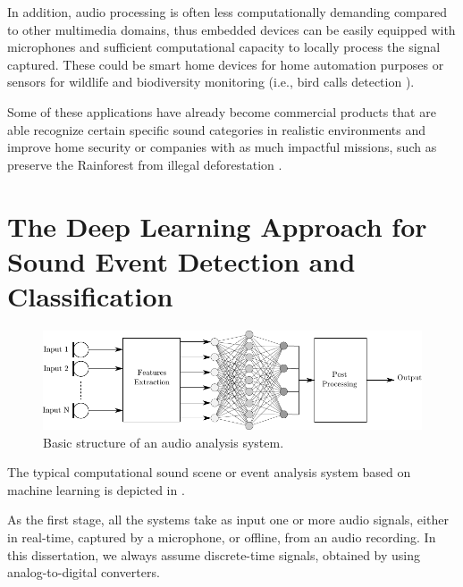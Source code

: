 In addition, audio processing is often less computationally demanding compared to other multimedia domains, thus embedded devices can be easily equipped with microphones and sufficient computational capacity to locally process the signal captured. These could be smart home devices for home automation purposes or sensors for wildlife and biodiversity monitoring (i.e., bird calls detection \cite{grill2017two}). 


Some of these applications have already become commercial products that are able recognize certain specific sound categories in realistic environments and improve home security \cite{audioanalytic}  or companies with as much impactful missions, such as preserve the Rainforest from illegal deforestation \cite{rainforest}.

\section[The Deep Learning Approach]{The Deep Learning Approach for Sound Event Detection and Classification}

\begin{figure}[h]
	\centering
	\includegraphics[width=\linewidth]{img/flowchart_1.pdf}
	\caption[Basic structure]{Basic structure of an audio analysis system.}
	\label{fig:base-system}
\end{figure}


The typical computational sound scene or event analysis system based on machine learning is depicted in .

As the first stage, all the systems take as input one or more audio
signals, either in real-time, captured by a microphone, or offline, from an
audio recording. In this dissertation, we always assume discrete-time signals,
obtained by using analog-to-digital converters. 

